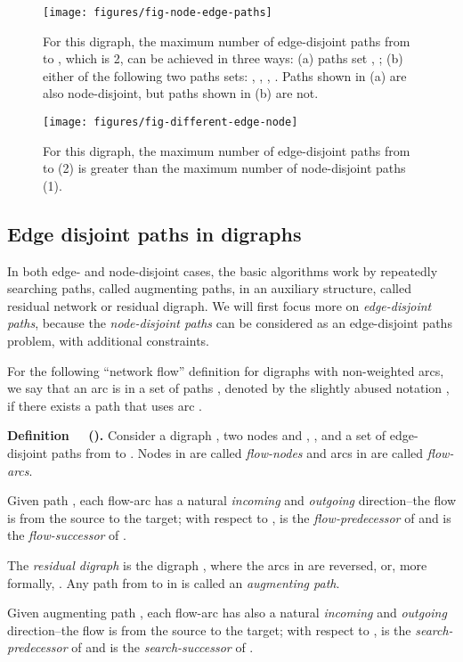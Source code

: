 \documentclass[preliminary,copyright,creativecommons]{eptcs}
\newenvironment{definition}[1][]
   {\refstepcounter{theorem} \par\medskip\noindent
   {\bf Definition~\thetheorem \ifx #1 \else ~(#1)\fi.} 
\ignorespaces }
   {\par\medskip }
\theoremstyle{remark}
\begin{document}
\begin{figure}[h]
\centerline{\texttt{[image: figures/fig-node-edge-paths]}}
\caption{For this digraph, the maximum number of edge-disjoint paths from  to , 
which is 2, can be achieved in three ways: 
(a) paths set , ;
(b) either of the following two paths sets: 
, , , .
Paths shown in (a) are also node-disjoint, but paths shown in (b) are not.}
\label{fig-node-edge-paths}
\end{figure}

\begin{figure}[h]
\centerline{\texttt{[image: figures/fig-different-edge-node]}}
\caption{For this digraph, 
the maximum number of edge-disjoint paths from  to  (2) 
is greater than the maximum number of node-disjoint paths (1).}
\label{fig-different-edge-node}
\end{figure}


\subsection{Edge disjoint paths in digraphs}
\label{sec-edge-disjoint-paths}

In both edge- and node-disjoint cases, 
the basic algorithms work by repeatedly searching paths,
called augmenting paths, in an auxiliary structure, called residual network
or residual digraph.
We will first focus more on \emph{edge-disjoint paths}, 
because the \emph{node-disjoint paths}
can be considered as an edge-disjoint paths problem, with additional constraints. 

For the following ``network flow'' definition for digraphs with non-weighted
arcs, we say that an arc  is in a set of paths , denoted 
by the slightly abused notation , if there exists 
a path  that uses arc .

\begin{definition}
Consider a digraph , two nodes  and , , 
and a set  of edge-disjoint paths from  to .
Nodes in  are called \emph{flow-nodes} and 
arcs in  are called \emph{flow-arcs}.

Given path , each flow-arc  has a natural 
\emph{incoming} and \emph{outgoing} direction--the flow is from the source to the target;
with respect to ,  is the \emph{flow-predecessor} of  and 
 is the \emph{flow-successor} of .

The \emph{residual digraph} is the digraph , 
where the arcs in  are reversed, or, more formally,
.
Any path from  to  in  is called an \emph{augmenting path}.

Given augmenting path , each flow-arc  has also a natural 
\emph{incoming} and \emph{outgoing} direction--the flow is from the source to the target;
with respect to ,  is the \emph{search-predecessor} of  and 
 is the \emph{search-successor} of .
\end{definition}
\end{document}
